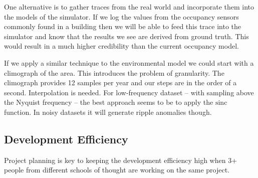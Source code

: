 \documentclass[10pt]{article}
\begin{document}
One alternative is to gather traces from the real world and incorporate them into the models of the simulator. If we log the values from the occupancy sensors commonly found in a building then we will be able to feed this trace into the simulator and know that the results we see are derived from ground truth. This would result in a much higher credibility than the current occupancy model.

If we apply a similar technique to the environmental model we could start with a climograph of the area. This introduces the problem of granularity. The climograph provides 12 samples per year and our steps are in the order of a second. Interpolation is needed. For low-frequency dataset -- with sampling above the Nyquist frequency -- the best approach seems to be to apply the $\mathrm{sinc}$ function. In noisy datasets it will generate ripple anomalies though.

\subsection{Development Efficiency}

Project planning is key to keeping the development efficiency high when 3+ people from different schools of thought are working on the same project.
\end{document}
